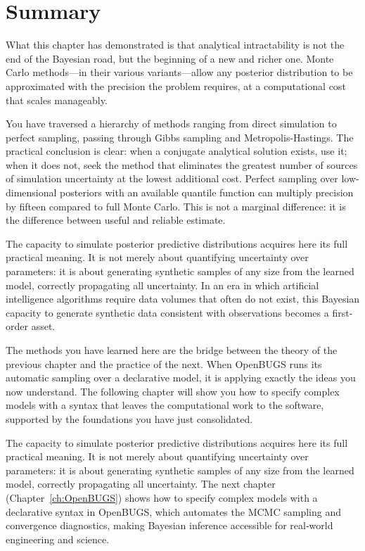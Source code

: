 \section{Summary}
What this chapter has demonstrated is that analytical intractability is not the end of the Bayesian road, but the beginning of a new and richer one. Monte Carlo methods---in their various variants---allow any posterior distribution to be approximated with the precision the problem requires, at a computational cost that scales manageably.

You have traversed a hierarchy of methods ranging from direct simulation to perfect sampling, passing through Gibbs sampling and Metropolis-Hastings. The practical conclusion is clear: when a conjugate analytical solution exists, use it; when it does not, seek the method that eliminates the greatest number of sources of simulation uncertainty at the lowest additional cost. Perfect sampling over low-dimensional posteriors with an available quantile function can multiply precision by fifteen compared to full Monte Carlo. This is not a marginal difference: it is the difference between useful and reliable estimate.

The capacity to simulate posterior predictive distributions acquires here its full practical meaning. It is not merely about quantifying uncertainty over parameters: it is about generating synthetic samples of any size from the learned model, correctly propagating all uncertainty. In an era in which artificial intelligence algorithms require data volumes that often do not exist, this Bayesian capacity to generate synthetic data consistent with observations becomes a first-order asset.

The methods you have learned here are the bridge between the theory of the previous chapter and the practice of the next. When OpenBUGS runs its automatic sampling over a declarative model, it is applying exactly the ideas you now understand. The following chapter will show you how to specify complex models with a syntax that leaves the computational work to the software, supported by the foundations you have just consolidated.

The capacity to simulate posterior predictive distributions acquires here its full practical meaning. It is not merely about quantifying uncertainty over parameters: it is about generating synthetic samples of any size from the learned model, correctly propagating all uncertainty. The next chapter (Chapter~\ref{ch:OpenBUGS}) shows how to specify complex models with a declarative syntax in OpenBUGS, which automates the MCMC sampling and convergence diagnostics, making Bayesian inference accessible for real‑world engineering and science.
